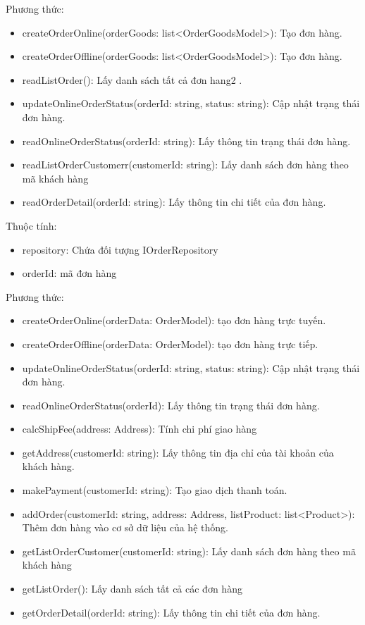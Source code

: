 Phương thức:
\begin{itemize}
	\item createOrderOnline(orderGoods: list<OrderGoodsModel>): Tạo đơn hàng.
	\item createOrderOffline(orderGoods: list<OrderGoodsModel>): Tạo đơn hàng.
	\item readListOrder(): Lấy danh sách tất cả đơn hang2 .
	\item updateOnlineOrderStatus(orderId: string, status: string): Cập nhật trạng thái đơn hàng.
	\item readOnlineOrderStatus(orderId: string): Lấy thông tin trạng thái đơn hàng.
	\item readListOrderCustomerr(customerId: string): Lấy danh sách đơn hàng theo mã khách hàng
	\item readOrderDetail(orderId: string): Lấy thông tin chi tiết của đơn hàng.
\end{itemize}

Thuộc tính:
\begin{itemize}
	\item repository: Chứa đối tượng IOrderRepository
	\item orderId: mã đơn hàng
\end{itemize}
Phương thức:
\begin{itemize}
	\item createOrderOnline(orderData: OrderModel): tạo đơn hàng trực tuyến.
	\item createOrderOffline(orderData: OrderModel): tạo đơn hàng trực tiếp.
	\item updateOnlineOrderStatus(orderId: string, status: string): Cập nhật trạng thái đơn hàng.
	\item readOnlineOrderStatus(orderId): Lấy thông tin trạng thái đơn hàng.
	\item calcShipFee(address: Address): Tính chi phí giao hàng
	\item getAddress(customerId: string): Lấy thông tin địa chỉ của tài khoản của khách hàng.
	\item makePayment(customerId: string): Tạo giao dịch thanh toán.
	\item addOrder(customerId: string, address: Address, listProduct: list<Product>): Thêm đơn hàng vào cơ sở dữ liệu của hệ thống.
	\item getListOrderCustomer(customerId: string): Lấy danh sách đơn hàng theo mã khách hàng
	\item getListOrder(): Lấy danh sách tất cả các đơn hàng
	\item getOrderDetail(orderId: string): Lấy thông tin chi tiết của đơn hàng.
\end{itemize}


